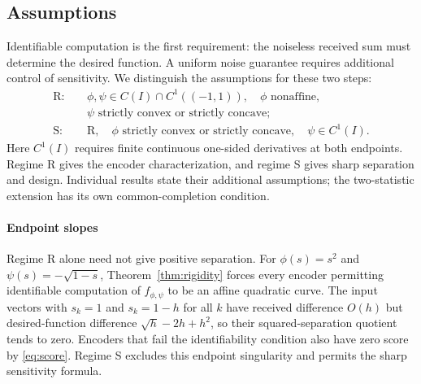 \subsection{Assumptions}\label{sec:assumptions}
Identifiable computation is the first requirement: the noiseless received sum must determine the desired function. A uniform noise guarantee requires additional control of sensitivity. We distinguish the assumptions for these two steps:
$$
\begin{aligned}
\mathrm{R}:\quad&\phi,\psi\in C(I)\cap C^1((-1,1)),\quad\phi\text{ nonaffine},\\
&\psi\text{ strictly convex or strictly concave};\\
\mathrm{S}:\quad&\mathrm{R},\quad\phi\text{ strictly convex or strictly concave},\quad\psi\in C^1(I).
\end{aligned}
$$
Here $C^1(I)$ requires finite continuous one-sided derivatives at both endpoints. Regime R gives the encoder characterization, and regime S gives sharp separation and design. Individual results state their additional assumptions; the two-statistic extension has its own common-completion condition.

\paragraph{Endpoint slopes}
Regime R alone need not give positive separation. For $\phi(s)=s^2$ and $\psi(s)=-\sqrt{1-s}$, Theorem~\ref{thm:rigidity} forces every encoder permitting identifiable computation of $f_{\phi,\psi}$ to be an affine quadratic curve. The input vectors with $s_k=1$ and $s_k=1-h$ for all $k$ have received difference $O(h)$ but desired-function difference $\sqrt h-2h+h^2$, so their squared-separation quotient tends to zero. Encoders that fail the identifiability condition also have zero score by \eqref{eq:score}. Regime S excludes this endpoint singularity and permits the sharp sensitivity formula.
